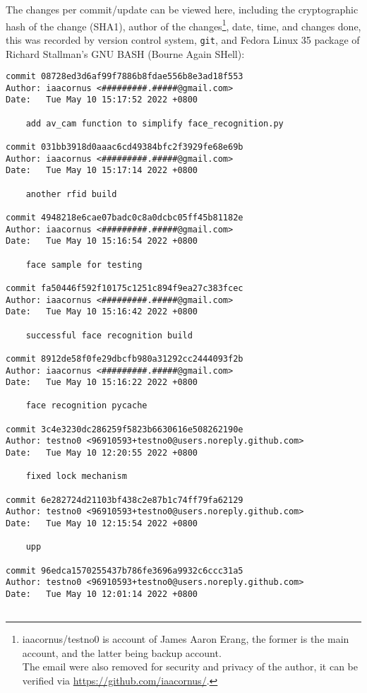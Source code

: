 \documentclass[12pt]{article}
\begin{document}
The changes per commit/update can be viewed here, including the cryptographic hash of the change (SHA1), author of the changes\footnote[3]{iaacornus/testno0 is account of James Aaron Erang, the former is the main account, and the latter being backup account.\\\indent \indent The email were also removed for security and privacy of the author, it can be verified via \href{https://github.com/iaacornus/}{https://github.com/iaacornus/}.}, date, time, and changes done, this was recorded by version control system, \texttt{git}, and Fedora Linux 35 package of Richard Stallman's GNU BASH (Bourne Again SHell):

\singlespacing
\begin{lstlisting}[caption={\texttt{git} log of the development.}]
commit 08728ed3d6af99f7886b8fdae556b8e3ad18f553
Author: iaacornus <#########.#####@gmail.com>
Date:   Tue May 10 15:17:52 2022 +0800

	add av_cam function to simplify face_recognition.py

commit 031bb3918d0aaac6cd49384bfc2f3929fe68e69b
Author: iaacornus <#########.#####@gmail.com>
Date:   Tue May 10 15:17:14 2022 +0800

	another rfid build

commit 4948218e6cae07badc0c8a0dcbc05ff45b81182e
Author: iaacornus <#########.#####@gmail.com>
Date:   Tue May 10 15:16:54 2022 +0800

	face sample for testing

commit fa50446f592f10175c1251c894f9ea27c383fcec
Author: iaacornus <#########.#####@gmail.com>
Date:   Tue May 10 15:16:42 2022 +0800

	successful face recognition build

commit 8912de58f0fe29dbcfb980a31292cc2444093f2b
Author: iaacornus <#########.#####@gmail.com>
Date:   Tue May 10 15:16:22 2022 +0800

	face recognition pycache

commit 3c4e3230dc286259f5823b6630616e508262190e
Author: testno0 <96910593+testno0@users.noreply.github.com>
Date:   Tue May 10 12:20:55 2022 +0800

	fixed lock mechanism

commit 6e282724d21103bf438c2e87b1c74ff79fa62129
Author: testno0 <96910593+testno0@users.noreply.github.com>
Date:   Tue May 10 12:15:54 2022 +0800

	upp

commit 96edca1570255437b786fe3696a9932c6ccc31a5
Author: testno0 <96910593+testno0@users.noreply.github.com>
Date:   Tue May 10 12:01:14 2022 +0800
	

\end{lstlisting}
\end{document}
